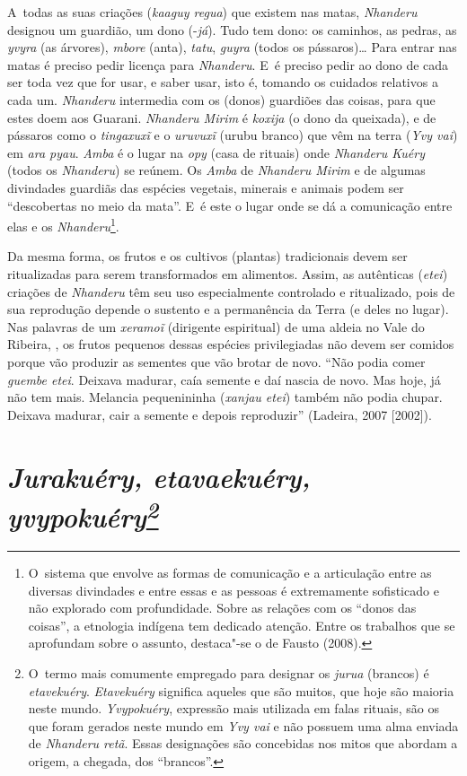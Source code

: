 A~todas as suas criações (\emph{kaaguy regua}) que existem nas matas, \emph{Nhanderu}
designou um guardião, um dono (-\emph{já}). Tudo tem dono: os caminhos, as
pedras, as \emph{yvyra} (as árvores), \emph{mbore} (anta), \emph{tatu}, \emph{guyra} (todos os
pássaros)\ldots{} Para entrar nas matas é preciso pedir licença para
\emph{Nhanderu}. E~é preciso pedir ao dono de cada ser toda vez que for usar,
e saber usar, isto é, tomando os cuidados relativos a cada um. \emph{Nhanderu}
intermedia com os (donos) guardiões das coisas, para que estes doem aos
Guarani. \emph{Nhanderu Mirim} é \emph{koxija} (o dono da queixada), e de pássaros
como o \emph{tingaxuxĩ} e o
\emph{uruvuxĩ} (urubu branco) que vêm na terra (\emph{Yvy vai})
em \emph{ara pyau}. \emph{Amba} é o lugar na \emph{opy} (casa de rituais) onde \emph{Nhanderu
Kuéry} (todos os \emph{Nhanderu}) se reúnem. Os \emph{Amba} de \emph{Nhanderu Mirim} e de
algumas divindades guardiãs das espécies vegetais, minerais e animais
podem ser ``descobertas no meio da mata''. E~é este o lugar onde se dá a
comunicação entre elas e os \emph{Nhanderu}\footnote{O~sistema que envolve as
formas de comunicação e a articulação entre as diversas divindades e
entre essas e as pessoas é extremamente sofisticado e não explorado com
profundidade. Sobre as relações com os ``donos das coisas'', a etnologia
indígena tem dedicado atenção. Entre os trabalhos que se aprofundam
sobre o assunto, destaca"-se o de Fausto (2008). }. 

Da mesma forma, os frutos e os cultivos (plantas) tradicionais devem ser
ritualizadas para serem transformados em alimentos. Assim, as
autênticas (\emph{etei}) criações de \emph{Nhanderu} têm seu uso especialmente
controlado e ritualizado, pois de sua reprodução depende o sustento e a
permanência da Terra (e deles no lugar). Nas palavras de um
\emph{xeramoĩ} (dirigente espiritual) de uma aldeia no
Vale do Ribeira, , os frutos pequenos dessas espécies privilegiadas
não devem ser comidos porque vão produzir as sementes que vão brotar de
novo. ``Não podia comer \emph{guembe etei}. Deixava madurar, caía semente e daí
nascia de novo. Mas hoje, já não tem mais. Melancia pequenininha
(\emph{xanjau etei}) também não podia chupar. Deixava madurar, cair a semente
e depois reproduzir'' (Ladeira, 2007 [2002]).

\section{\emph{Jurakuéry, etavaekuéry, yvypokuéry\footnotesize\protect\footnote{\uppercase{O}~termo
mais comumente
empregado para designar os \emph{jurua} (brancos) é \emph{etavekuéry}. \emph{
\uppercase{E}tavekuéry}
significa aqueles que são muitos, que hoje são maioria neste mundo.
\emph{\uppercase{Y}vypokuéry}, expressão mais utilizada em falas rituais, são os que foram
gerados neste mundo em \emph{\uppercase{Y}vy vai} e não possuem uma alma enviada de
\emph{\uppercase{N}handeru retã}. \uppercase{E}ssas designações
são concebidas nos mitos que abordam a
origem, a chegada, dos ``brancos''.}}}


